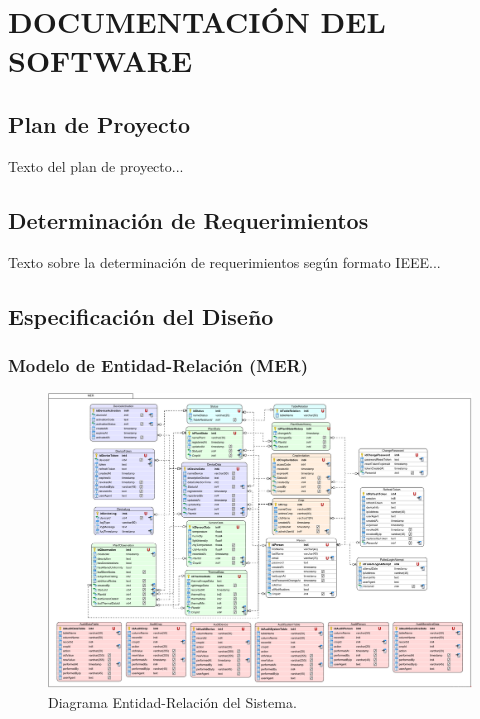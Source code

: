 \chapter{DOCUMENTACIÓN DEL SOFTWARE}

\section{Plan de Proyecto}
Texto del plan de proyecto...

\section{Determinación de Requerimientos}
Texto sobre la determinación de requerimientos según formato IEEE...

\section{Especificación del Diseño}


\subsection{Modelo de Entidad-Relación (MER)}
\begin{figure}[H]
    \centering
    \caption{Diagrama Entidad-Relación del Sistema.}
    \label{fig:der}
    \includegraphics[width=1\textwidth]{UML/Otros/Diagrama Entidad Relacion.png}
\end{figure}

